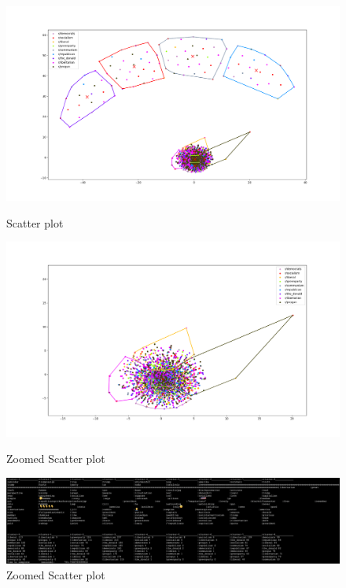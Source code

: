 \documentclass{article}
\begin{document}
\begin{figure}[!h]
  \includegraphics[width=\linewidth]{Figure_2.png}
  \caption{Scatter plot}
  \includegraphics[width=\linewidth]{Figure_3.png}
  \caption{Zoomed Scatter plot}
  \includegraphics[width=\linewidth]{SS1.png}
  \caption{Zoomed Scatter plot}
\end{figure}
\end{document}
